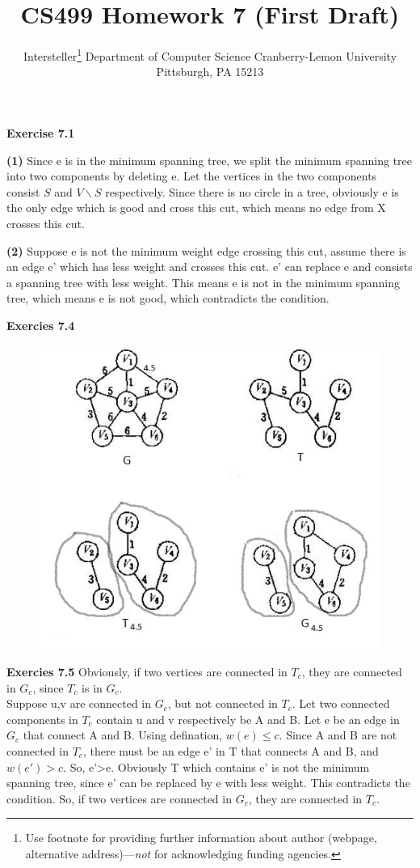 \documentclass{article} %
\title{CS499 Homework 7 (First Draft)}
\author{
	Intersteller\thanks{ Use footnote for providing further information
		about author (webpage, alternative address)---\emph{not} for acknowledging
		funding agencies.}
	Department of Computer Science
	Cranberry-Lemon University
	Pittsburgh, PA 15213
}
\begin{document}
	\maketitle
	\textbf{Exercise 7.1}\par
	\textbf{(1)}  Since e is in the minimum spanning tree, we split the minimum spanning tree into two components by deleting e. Let the vertices in the two components consist $S$ and $V\backslash S$ respectively. Since there is no circle in a tree, obviously e is the only edge which is good and cross this cut, which means no edge from X crosses this cut. \par
	\textbf{(2)}  Suppose e is not the minimum weight edge crossing this cut, assume there is an edge e' which has less weight and crosses this cut. e' can replace e and consists a spanning tree with less weight. This means e is not in the minimum spanning tree, which means e is not good, which contradicts the condition.\par
	\textbf{Exercies 7.4}
	\begin{figure}[H]
		\centering
		\includegraphics[scale=0.6]{P1.png}
		\caption{}
		\label{fig:1}
	\end{figure}

	\textbf{Exercies 7.5}
	Obviously, if two vertices are connected in $T_c$, they are connected in $G_c$, since $T_c$ is in $G_c$.\\
	Suppose u,v are connected in $G_c$, but not connected in $T_c$. Let two connected components in $T_c$ contain u and v respectively be A and B. Let e be an edge in $G_c$ that connect A and B. Using defination, $w(e)\leq c$. Since A and B are not connected in $T_c$, there must be an edge e' in T that connects A and B, and $w(e')>c$. So, e'>e. Obviously T which contains e' is not the minimum spanning tree, since e' can be replaced by e with less weight. This contradicts the condition. So, if two vertices are connected in $G_c$, they are connected in $T_c$.\par 
\end{document}
